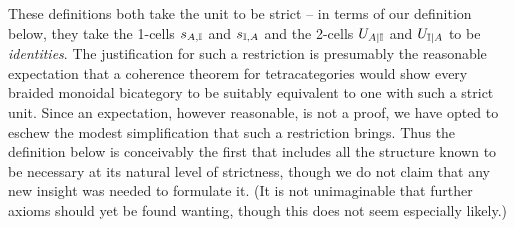 \documentclass{robinthesisdraft}
\begin{document}
These definitions both take the unit to be strict -- in terms of
our definition below, they take the 1-cells $s_{A,{\mathbb{I}}}$ and $s_{{\mathbb{I}},A}$
and the 2-cells $U_{A|{\mathbb{I}}}$ and $U_{{\mathbb{I}}|A}$ to be \emph{identities}.
The justification for such a restriction is presumably the reasonable
expectation that a coherence theorem for tetracategories would
show every braided monoidal bicategory to be suitably equivalent
to one with such a strict unit. Since an expectation, however
reasonable, is not a proof, we have opted to eschew the modest
simplification that such a restriction brings.
%
Thus the definition below is conceivably the first that
includes all the structure known to be necessary at its natural level
of strictness, though we do not claim that any new insight was needed
to formulate it. (It is not unimaginable that further axioms should yet
be found wanting, though this does not seem especially likely.)
%
\end{document}
